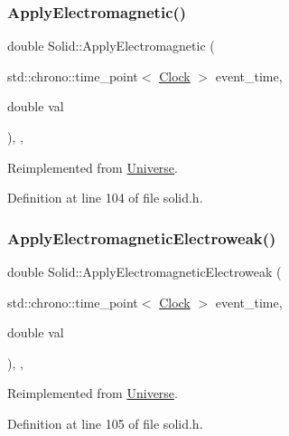 \subsubsection{\texorpdfstring{Apply\+Electromagnetic()}{ApplyElectromagnetic()}}
{\footnotesize\ttfamily double Solid\+::\+Apply\+Electromagnetic (\begin{DoxyParamCaption}\item[{std\+::chrono\+::time\+\_\+point$<$ \mbox{\hyperlink{universe_8h_a0ef8d951d1ca5ab3cfaf7ab4c7a6fd80}{Clock}} $>$}]{event\+\_\+time,  }\item[{double}]{val }\end{DoxyParamCaption})\hspace{0.3cm}{\ttfamily [inline]}, {\ttfamily [final]}, {\ttfamily [virtual]}}



Reimplemented from \mbox{\hyperlink{class_universe_a1f787da78fa196ba635db21a9e91dabb}{Universe}}.



Definition at line 104 of file solid.\+h.

\mbox{\label{class_solid_a46702e3109994b310eb4f1fba5610e0b}} 
\subsubsection{\texorpdfstring{Apply\+Electromagnetic\+Electroweak()}{ApplyElectromagneticElectroweak()}}
{\footnotesize\ttfamily double Solid\+::\+Apply\+Electromagnetic\+Electroweak (\begin{DoxyParamCaption}\item[{std\+::chrono\+::time\+\_\+point$<$ \mbox{\hyperlink{universe_8h_a0ef8d951d1ca5ab3cfaf7ab4c7a6fd80}{Clock}} $>$}]{event\+\_\+time,  }\item[{double}]{val }\end{DoxyParamCaption})\hspace{0.3cm}{\ttfamily [inline]}, {\ttfamily [final]}, {\ttfamily [virtual]}}



Reimplemented from \mbox{\hyperlink{class_universe_a4c36c1ab30db993307f88363dde5e8c5}{Universe}}.



Definition at line 105 of file solid.\+h.

